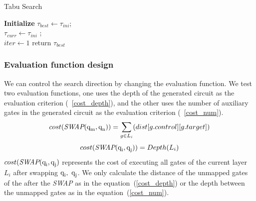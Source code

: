 \documentclass[runningheads]{llncs}
\begin{document}
			\begin{algorithm} 
			\label{algorithm_Tabu}
				\caption{Tabu Search }  
				\LinesNumbered  
				\textbf{Initialize}
					$\tau_{best}  \leftarrow \tau_{ini}$; \\
					$\tau_{curr} \leftarrow \tau_{ini}$ ;\\
					$iter \leftarrow 1$  
				return $\tau_{best}$
				\end{algorithm}
\subsubsection{Evaluation function design }
We can control the search direction by changing the evaluation function.
We test two evaluation functions, one uses the depth of the generated circuit as the evaluation criterion  (~\ref{cost_depth}), and the other uses the number of auxiliary gates in the generated circuit as the evaluation criterion (~\ref{cost_num}).
\begin{equation}
	cost(\textit{SWAP}(\textup{q}_\textup{m},\textup{q}_\textup{n}))= \sum_{g \in L_{i}}(dist[g.control][g.target])
	\label{cost_num}
\end{equation}
	\begin{equation}
		cost(\textit{SWAP}(\textup{q}_\textup{i},\textup{q}_\textup{j}))= Depth(L_{i})
		\label{cost_depth}
		\end{equation}
$cost(\textit{SWAP}(\textup{q}_\textup{i},\textup{q}_\textup{j})$ represents the cost of executing all gates of the current layer $L_i$ 
after swapping $\textup{q}_\textup{i}, \ \textup{q}_\textup{j}$. We only calculate the distance of the unmapped gates of the after the \textit{SWAP} as in the equation~(\ref{cost_depth}) or the depth between the unmapped gates as in the equation~(\ref{cost_num}).
\end{document}
